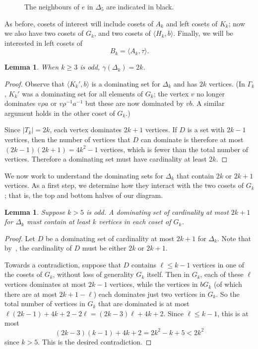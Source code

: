 \documentclass{amsart}
\newtheorem{lem}[thm]{Lemma}
\theoremstyle{remark}
\theoremstyle{definition}
\begin{document}
\begin{figure}
\begin{tikzpicture}
    \end{tikzpicture}
    \caption{The neighbours of $e$ in $\Delta_5$ are indicated in black.}\label{fig3}
\end{figure}


As before, cosets of interest will include cosets of $A_k$ and left cosets of $K_k$; now we also have two cosets of $G_k$, and two cosets of $\langle H_k, b\rangle$. Finally, we will be interested in left cosets of $$B_k=\langle A_k, \tau \rangle.$$

\begin{lem}\label{dom-delta}
    When $k \ge 3$ is odd, $\gamma(\Delta_k)=2k$.
\end{lem}

\begin{proof}
    Observe that $\langle K_k',b\rangle$ is a dominating set for $\Delta_k$ and has $2k$ vertices. (In $\Gamma_k$, $K_k'$ was a dominating set for all elements of $G_k$; the vertex $v$ no longer dominates $v\rho a$ or $v\rho^{-1}a^{-1}$ but these are now dominated by $vb$. A similar argument holds in the other coset of $G_k$.)

    Since $|T_k|=2k$, each vertex dominates $2k+1$ vertices. If $D$ is a set with $2k-1$ vertices, then the number of vertices that $D$ can dominate is therefore at most $(2k-1)(2k+1)=4k^2-1$ vertices, which is fewer than the total number of vertices. Therefore a dominating set must have cardinality at least $2k$.
\end{proof}

We now work to understand the dominating sets for $\Delta_k$ that contain $2k$ or $2k+1$ vertices. As a first step, we determine how they interact with the two cosets of $G_k$; that is, the top and bottom halves of our diagram.

\begin{lem}\label{balanced-copies}
    Suppose $k >5$ is odd. A dominating set of cardinality at most $2k+1$ for $\Delta_k$ must contain at least $k$ vertices in each coset of $G_k$.
\end{lem}

\begin{proof}
    Let $D$ be a dominating set of cardinality at most $2k+1$ for $\Delta_k$. Note that by~, the cardinality of $D$ must be either $2k$ or $2k+1$.
    
    Towards a contradiction, suppose that $D$ contains $\ell \le k-1$ vertices in one of the cosets of $G_k$, without loss of generality $G_k$ itself. Then in $G_k$, each of these $\ell$ vertices dominates at most $2k-1$ vertices, while the vertices in $bG_k$ (of which there are at most $2k+1-\ell$) each dominates just two vertices in $G_k$. So the total number of vertices in $G_k$ that are dominated is at most $\ell(2k-1)+4k+2-2\ell=(2k-3)\ell +4k+2$. Since $\ell \le k-1$, this is at most $$(2k-3)(k-1)+4k+2=2k^2-k+5<2k^2$$ since $k >5$. This is the desired contradiction.
\end{proof}
\end{document}

